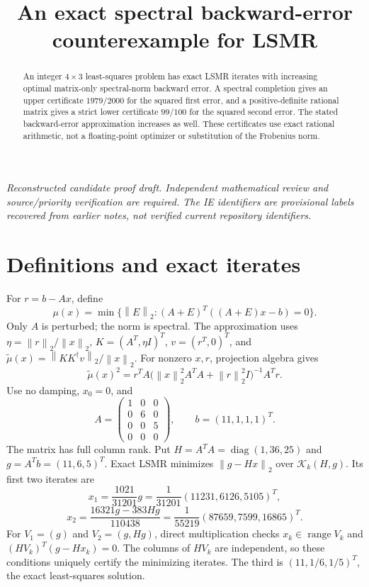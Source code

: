 \documentclass[11pt]{article}
\title{An exact spectral backward-error counterexample for LSMR}
\author{}
\date{}
\newcommand{\norm}[1]{\left\lVert#1\right\rVert}
\newcommand{\diag}{\operatorname{diag}}
\begin{document}
\maketitle
\noindent\textit{Reconstructed candidate proof draft. Independent mathematical review and source/priority verification are required. The IE identifiers are provisional labels recovered from earlier notes, not verified current repository identifiers.}


\begin{abstract}
An integer $4\times3$ least-squares problem has exact LSMR iterates with increasing optimal matrix-only spectral-norm backward error. A spectral completion gives an upper certificate $1979/2000$ for the squared first error, and a positive-definite rational matrix gives a strict lower certificate $99/100$ for the squared second error. The stated backward-error approximation increases as well. These certificates use exact rational arithmetic, not a floating-point optimizer or substitution of the Frobenius norm.
\end{abstract}
\section{Definitions and exact iterates}
For $r=b-Ax$, define
\[
\mu(x)=\min\{\norm E_2:(A+E)^T((A+E)x-b)=0\}.
\]
Only $A$ is perturbed; the norm is spectral. The approximation uses $\eta=\norm r_2/\norm x_2$, $K=(A^T,\eta I)^T$, $v=(r^T,0)^T$, and $\widetilde\mu(x)=\norm{KK^\dagger v}_2/\norm x_2$. For nonzero $x,r$, projection algebra gives
\[
\widetilde\mu(x)^2=r^TA\bigl(\norm x_2^2A^TA+\norm r_2^2I\bigr)^{-1}A^Tr.
\]
Use no damping, $x_0=0$, and
\[
A=\begin{pmatrix}1&0&0\\0&6&0\\0&0&5\\0&0&0\end{pmatrix},\qquad b=(11,1,1,1)^T.
\]
The matrix has full column rank. Put $H=A^TA=\diag(1,36,25)$ and $g=A^Tb=(11,6,5)^T$. Exact LSMR minimizes $\norm{g-Hx}_2$ over $\mathcal K_k(H,g)$. Its first two iterates are
\[
x_1=\frac{1021}{31201}g=\frac1{31201}(11231,6126,5105)^T,
\]
\[
x_2=\frac{16321g-383Hg}{110438}=\frac1{55219}(87659,7599,16865)^T.
\]
For $V_1=(g)$ and $V_2=(g,Hg)$, direct multiplication checks $x_k\in\operatorname{range}V_k$ and $(HV_k)^T(g-Hx_k)=0$. The columns of $HV_k$ are independent, so these conditions uniquely certify the minimizing iterates. The third is $(11,1/6,1/5)^T$, the exact least-squares solution.
\end{document}
